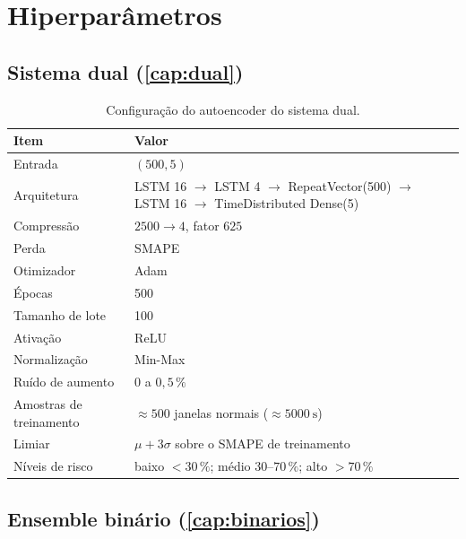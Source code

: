 \section{Hiperparâmetros}

\subsection{Sistema dual (\cref{cap:dual})}

\begin{table}[htbp]
\centering
\caption{Configuração do autoencoder do sistema dual.}
\label{tab:rep-dual}
\small
\begin{tabular}{lp{9.4cm}}
\toprule
\textbf{Item} & \textbf{Valor} \\
\midrule
Entrada & $(500, 5)$ \\
Arquitetura & LSTM 16 $\to$ LSTM 4 $\to$ RepeatVector(500) $\to$ LSTM 16 $\to$
TimeDistributed Dense(5) \\
Compressão & $2500 \to 4$, fator $625$ \\
Perda & SMAPE \\
Otimizador & Adam \\
Épocas & 500 \\
Tamanho de lote & 100 \\
Ativação & ReLU \\
Normalização & Min-Max \\
Ruído de aumento & 0 a $0{,}5\,\%$ \\
Amostras de treinamento & $\approx 500$ janelas normais ($\approx \SI{5000}{\second}$) \\
Limiar & $\mu + 3\sigma$ sobre o SMAPE de treinamento \\
Níveis de risco & baixo $< 30\,\%$; médio $30$--$70\,\%$; alto $> 70\,\%$ \\
\bottomrule
\end{tabular}
\end{table}

\subsection{Ensemble binário (\cref{cap:binarios})}

